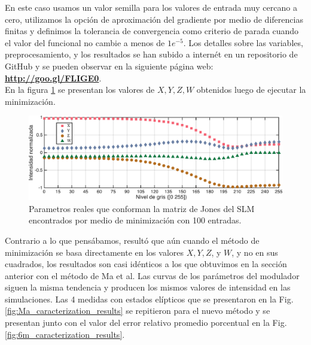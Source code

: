 En este caso usamos un valor semilla para los valores de entrada muy
cercano a cero, utilizamos la opción de aproximación del gradiente
por medio de diferencias finitas y definimos la tolerancia de
convergencia como criterio de parada cuando el valor del funcional no
cambie a menos de $1e^{-5}$. Los detalles sobre las variables,
preprocesamiento, y los resultados se han subido a internét en un
repositorio de GitHub y se pueden observar en la siguiente página
web:\\
\hspace*{\fill} \href{http://goo.gl/FLIGE0}{\textbf{http://goo.gl/FLIGE0}}.\hspace*{\fill} \\
En la figura \ref{fig:xyzw} se presentan los valores de $X,Y,Z,W$ obtenidos luego de
ejecutar la minimización. 
\begin{figure}[h!]
\centering
\includegraphics[scale=.55]{xyzw.pdf}
\caption[Parametros reales que conforman la matriz de Jones del SLM
encontrados por minimización con 6 medidas]{Parametros reales que
  conforman la matriz de Jones del SLM encontrados por medio de
  minimización con 100 entradas.} 
\label{fig:xyzw}
\end{figure}
Contrario a lo que pensábamos, resultó que aún cuando el método de
minimización se basa directamente en los valores $X,Y,Z$, y $W$, y no
en sus cuadrados, los resultados son casi idénticos a los que
obtuvimos en la sección anterior con el método de Ma et al. Las curvas
de los parámetros del modulador siguen la misma tendencia y producen
los mismos valores de intensidad en las simulaciones. Las 4 medidas
con estados elípticos que se  
presentaron en la Fig. \ref{fig:Ma_caracterization_results} se
repitieron para el nuevo método y se presentan junto con el valor del
error relativo promedio porcentual en la
Fig. \ref{fig:6m_caracterization_results}. 
